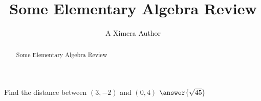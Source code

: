 \documentclass{ximera}
\title{Some Elementary Algebra Review}
\author{A Ximera Author}
\begin{document}
\begin{abstract}
Some Elementary Algebra Review
\end{abstract}

\maketitle

\begin{problem}
   Find the distance between $(3, -2)$ and $(0, 4)$ $\answer{\sqrt{45}}$
\end{problem}
\end{document}
